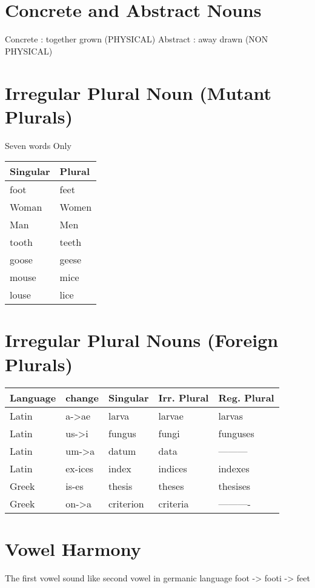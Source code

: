 \documentclass[11pt]{article}
\begin{document}
\section{Concrete and Abstract Nouns}
\label{sec:org3e76baa}
Concrete : together grown (PHYSICAL)
Abstract : away drawn (NON PHYSICAL)

\section{Irregular Plural Noun (Mutant Plurals)}
\label{sec:org69bf592}
Seven words Only
\begin{center}
\begin{tabular}{ll}
Singular & Plural\\
\hline
foot & feet\\
Woman & Women\\
Man & Men\\
tooth & teeth\\
goose & geese\\
mouse & mice\\
louse & lice\\
\end{tabular}
\end{center}

\section{Irregular Plural Nouns (Foreign Plurals)}
\label{sec:org0feb113}
\begin{center}
\begin{tabular}{lllll}
Language & change & Singular & Irr. Plural & Reg. Plural\\
\hline
Latin & a->ae & larva & larvae & larvas\\
Latin & us->i & fungus & fungi & funguses\\
Latin & um->a & datum & data & ---------\\
Latin & ex-ices & index & indices & indexes\\
Greek & is-es & thesis & theses & thesises\\
Greek & on->a & criterion & criteria & ----------\\
\end{tabular}
\end{center}

\section{Vowel Harmony}
\label{sec:org2546ba2}
The first vowel sound like second vowel in germanic language
foot -> footi -> feet
\end{document}
